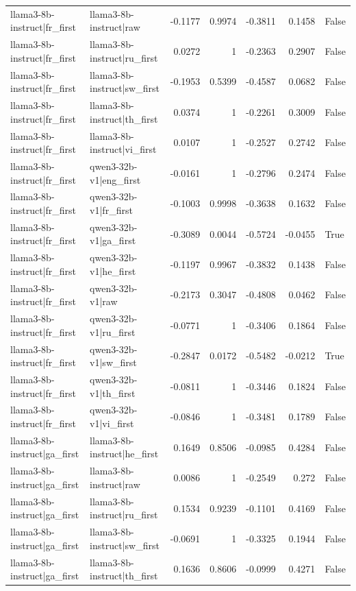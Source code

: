 \begin{table}
\begin{tabular}{l l r r r r l}
llama3-8b-instruct|fr_first & llama3-8b-instruct|raw & -0.1177 & 0.9974 & -0.3811 & 0.1458 & False \\
llama3-8b-instruct|fr_first & llama3-8b-instruct|ru_first & 0.0272 & 1 & -0.2363 & 0.2907 & False \\
llama3-8b-instruct|fr_first & llama3-8b-instruct|sw_first & -0.1953 & 0.5399 & -0.4587 & 0.0682 & False \\
llama3-8b-instruct|fr_first & llama3-8b-instruct|th_first & 0.0374 & 1 & -0.2261 & 0.3009 & False \\
llama3-8b-instruct|fr_first & llama3-8b-instruct|vi_first & 0.0107 & 1 & -0.2527 & 0.2742 & False \\
llama3-8b-instruct|fr_first & qwen3-32b-v1|eng_first & -0.0161 & 1 & -0.2796 & 0.2474 & False \\
llama3-8b-instruct|fr_first & qwen3-32b-v1|fr_first & -0.1003 & 0.9998 & -0.3638 & 0.1632 & False \\
llama3-8b-instruct|fr_first & qwen3-32b-v1|ga_first & -0.3089 & 0.0044 & -0.5724 & -0.0455 & True \\
llama3-8b-instruct|fr_first & qwen3-32b-v1|he_first & -0.1197 & 0.9967 & -0.3832 & 0.1438 & False \\
llama3-8b-instruct|fr_first & qwen3-32b-v1|raw & -0.2173 & 0.3047 & -0.4808 & 0.0462 & False \\
llama3-8b-instruct|fr_first & qwen3-32b-v1|ru_first & -0.0771 & 1 & -0.3406 & 0.1864 & False \\
llama3-8b-instruct|fr_first & qwen3-32b-v1|sw_first & -0.2847 & 0.0172 & -0.5482 & -0.0212 & True \\
llama3-8b-instruct|fr_first & qwen3-32b-v1|th_first & -0.0811 & 1 & -0.3446 & 0.1824 & False \\
llama3-8b-instruct|fr_first & qwen3-32b-v1|vi_first & -0.0846 & 1 & -0.3481 & 0.1789 & False \\
llama3-8b-instruct|ga_first & llama3-8b-instruct|he_first & 0.1649 & 0.8506 & -0.0985 & 0.4284 & False \\
llama3-8b-instruct|ga_first & llama3-8b-instruct|raw & 0.0086 & 1 & -0.2549 & 0.272 & False \\
llama3-8b-instruct|ga_first & llama3-8b-instruct|ru_first & 0.1534 & 0.9239 & -0.1101 & 0.4169 & False \\
llama3-8b-instruct|ga_first & llama3-8b-instruct|sw_first & -0.0691 & 1 & -0.3325 & 0.1944 & False \\
llama3-8b-instruct|ga_first & llama3-8b-instruct|th_first & 0.1636 & 0.8606 & -0.0999 & 0.4271 & False \\

\end{tabular}
\end{table}
